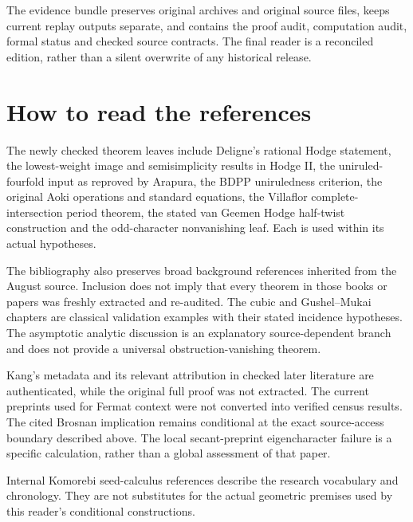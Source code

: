 The evidence bundle preserves original archives and original source files, keeps current replay outputs separate, and contains the proof audit, computation audit, formal status and checked source contracts. The final reader is a reconciled edition, rather than a silent overwrite of any historical release.

\chapter{How to read the references}
The newly checked theorem leaves include Deligne's rational Hodge statement, the lowest-weight image and semisimplicity results in Hodge II, the uniruled-fourfold input as reproved by Arapura, the BDPP uniruledness criterion, the original Aoki operations and standard equations, the Villaflor complete-intersection period theorem, the stated van Geemen Hodge half-twist construction and the odd-character nonvanishing leaf. Each is used within its actual hypotheses.

The bibliography also preserves broad background references inherited from the August source. Inclusion does not imply that every theorem in those books or papers was freshly extracted and re-audited. The cubic and Gushel--Mukai chapters are classical validation examples with their stated incidence hypotheses. The asymptotic analytic discussion is an explanatory source-dependent branch and does not provide a universal obstruction-vanishing theorem.

Kang's metadata and its relevant attribution in checked later literature are authenticated, while the original full proof was not extracted. The current preprints used for Fermat context were not converted into verified census results. The cited Brosnan implication remains conditional at the exact source-access boundary described above. The local secant-preprint eigencharacter failure is a specific calculation, rather than a global assessment of that paper.

Internal Komorebi seed-calculus references describe the research vocabulary and chronology. They are not substitutes for the actual geometric premises used by this reader's conditional constructions.
